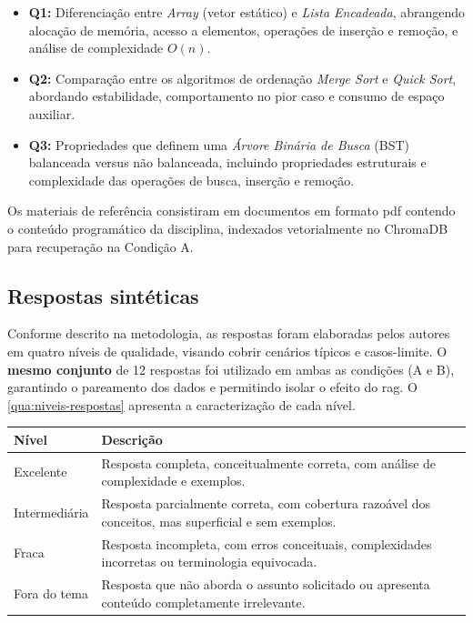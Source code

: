 \begin{itemize}
    \item \textbf{Q1:} Diferenciação entre \textit{Array} (vetor estático) e \textit{Lista Encadeada}, abrangendo alocação de memória, acesso a elementos, operações de inserção e remoção, e análise de complexidade $O(n)$.
    \item \textbf{Q2:} Comparação entre os algoritmos de ordenação \textit{Merge Sort} e \textit{Quick Sort}, abordando estabilidade, comportamento no pior caso e consumo de espaço auxiliar.
    \item \textbf{Q3:} Propriedades que definem uma \textit{Árvore Binária de Busca} (BST) balanceada versus não balanceada, incluindo propriedades estruturais e complexidade das operações de busca, inserção e remoção.
\end{itemize}

Os materiais de referência consistiram em documentos em formato \gls{pdf} contendo o conteúdo programático da disciplina, indexados vetorialmente no ChromaDB para recuperação na Condição A.

\subsection{Respostas sintéticas}

Conforme descrito na metodologia, as respostas foram elaboradas pelos autores em quatro níveis de qualidade, visando cobrir cenários típicos e casos-limite. O \textbf{mesmo conjunto} de 12 respostas foi utilizado em ambas as condições (A e B), garantindo o pareamento dos dados e permitindo isolar o efeito do \gls{rag}. O \autoref{qua:niveis-respostas} apresenta a caracterização de cada nível.

\begin{quadro}[H]
    \centering
    \caption{Caracterização dos níveis de qualidade das respostas sintéticas}
    \label{qua:niveis-respostas}
    {\small
    \begin{tabularx}{\textwidth}{|p{}|X|}
        \hline
        \textbf{Nível} & \textbf{Descrição} \\
        \hline
        Excelente & Resposta completa, conceitualmente correta, com análise de complexidade e exemplos. \\
        \hline
        Intermediária & Resposta parcialmente correta, com cobertura razoável dos conceitos, mas superficial e sem exemplos. \\
        \hline
        Fraca & Resposta incompleta, com erros conceituais, complexidades incorretas ou terminologia equivocada. \\
        \hline
        Fora do tema & Resposta que não aborda o assunto solicitado ou apresenta conteúdo completamente irrelevante. \\
        \hline
    \end{tabularx}
    }
\end{quadro}


